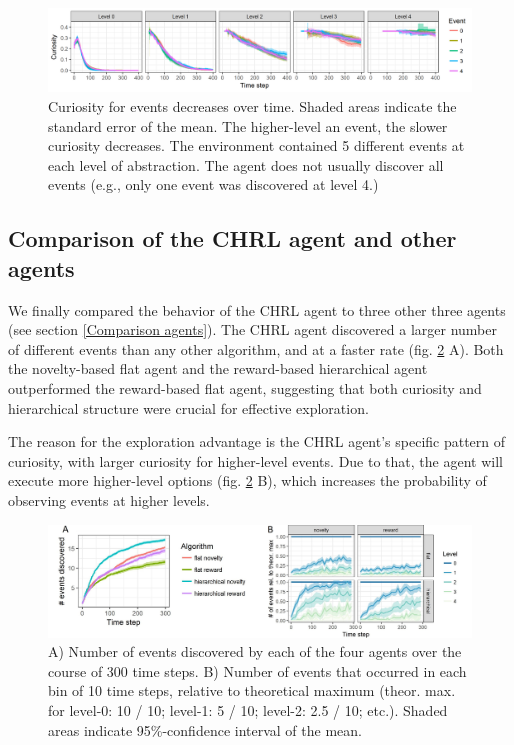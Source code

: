 \documentclass{article}
\begin{document}
\begin{figure}[h]
	\centering
	\includegraphics[width=\linewidth]{ACuriosity.png}
	\caption{Curiosity for events decreases over time. Shaded areas indicate the standard error of the mean. The higher-level an event, the slower curiosity decreases. The environment contained 5 different events at each level of abstraction. The agent does not usually discover all events (e.g., only one event was discovered at level 4.)}
	\label{CuriosityFigure}
\end{figure}

\subsection{Comparison of the CHRL agent and other agents} \label{Results compare all}

We finally compared the behavior of the CHRL agent to three other three agents (see section \ref{Comparison agents}). The CHRL agent discovered a larger number of different events than any other algorithm, and at a faster rate (fig. \ref{CEvents} A). Both the novelty-based flat agent and the reward-based hierarchical agent outperformed the reward-based flat agent, suggesting that both curiosity and hierarchical structure were crucial for effective exploration.

The reason for the exploration advantage is the CHRL agent's specific pattern of curiosity, with larger curiosity for higher-level events. Due to that, the agent will execute more higher-level options (fig. \ref{CEvents} B), which increases the probability of observing events at higher levels. 

\begin{figure}[h]
	\centering
	\includegraphics[width=\linewidth]{CEvents.jpg}
	\caption{A) Number of events discovered by each of the four agents over the course of 300 time steps. B) Number of events that occurred in each bin of 10 time steps, relative to theoretical maximum (theor. max. for level-0: 10 / 10; level-1: 5 / 10; level-2: 2.5 / 10; etc.). Shaded areas indicate 95\%-confidence interval of the mean.}
	\label{CEvents}
\end{figure}
\end{document}

